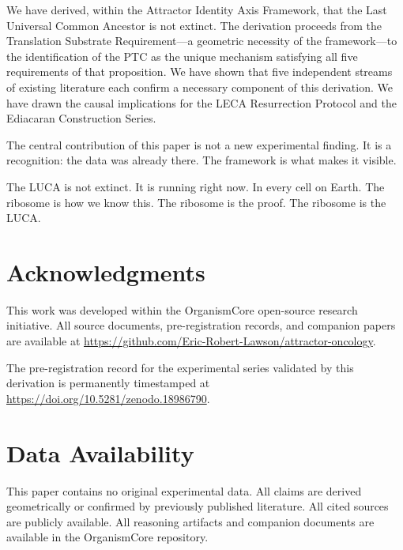 \documentclass[11pt]{article}
\theoremstyle{definition}
\begin{document}
We have derived, within the Attractor Identity Axis Framework,
that the Last Universal Common Ancestor is not extinct.
The derivation proceeds from the Translation Substrate
Requirement---a geometric necessity of the framework---to
the identification of the PTC as the unique mechanism
satisfying all five requirements of that proposition.
We have shown that five independent streams of existing
literature each confirm a necessary component of this
derivation.
We have drawn the causal implications for the LECA
Resurrection Protocol and the Ediacaran Construction Series.

The central contribution of this paper is not a new
experimental finding.
It is a recognition: the data was already there.
The framework is what makes it visible.

The LUCA is not extinct.
It is running right now.
In every cell on Earth.
The ribosome is how we know this.
The ribosome is the proof.
The ribosome is the LUCA.

\section*{Acknowledgments}

This work was developed within the OrganismCore open-source
research initiative.
All source documents, pre-registration records, and
companion papers are available at
\url{https://github.com/Eric-Robert-Lawson/attractor-oncology}.

The pre-registration record for the experimental series
validated by this derivation is permanently timestamped at
\url{https://doi.org/10.5281/zenodo.18986790}.

\section*{Data Availability}

This paper contains no original experimental data.
All claims are derived geometrically or confirmed by
previously published literature.
All cited sources are publicly available.
All reasoning artifacts and companion documents are
available in the OrganismCore repository.
\end{document}
